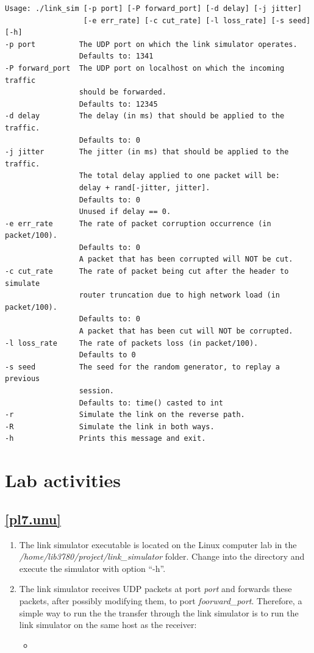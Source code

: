 \documentclass[12pt]{book}
\begin{document}
\begin{enumerate}[label=\arabic*.]
\begin{itemize}[label=--]
\begin{verbatim}
Usage: ./link_sim [-p port] [-P forward_port] [-d delay] [-j jitter]
                  [-e err_rate] [-c cut_rate] [-l loss_rate] [-s seed] [-h]
-p port          The UDP port on which the link simulator operates.
                 Defaults to: 1341
-P forward_port  The UDP port on localhost on which the incoming traffic
                 should be forwarded.
                 Defaults to: 12345
-d delay         The delay (in ms) that should be applied to the traffic.
                 Defaults to: 0
-j jitter        The jitter (in ms) that should be applied to the traffic.
                 The total delay applied to one packet will be:
                 delay + rand[-jitter, jitter].
                 Defaults to: 0
                 Unused if delay == 0.
-e err_rate      The rate of packet corruption occurrence (in packet/100).
                 Defaults to: 0
                 A packet that has been corrupted will NOT be cut.
-c cut_rate      The rate of packet being cut after the header to simulate
                 router truncation due to high network load (in packet/100).
                 Defaults to: 0
                 A packet that has been cut will NOT be corrupted.
-l loss_rate     The rate of packets loss (in packet/100).
                 Defaults to 0
-s seed          The seed for the random generator, to replay a previous
                 session.
                 Defaults to: time() casted to int
-r               Simulate the link on the reverse path.
-R               Simulate the link in both ways.
-h               Prints this message and exit. 
\end{verbatim}
  \end{itemize}


\section{Lab activities}


\subsection{\ref{pl7.unu}}

\begin{enumerate}[label=Activity \arabic*)]
\item The link simulator executable is located on the Linux computer lab in the \emph{/home/lib3780/project/link\_simulator} folder. Change into the directory and execute the simulator with option ``-h''.

\item The link simulator receives UDP packets at port \emph{port} and forwards these packets, after possibly modifying them, to port \emph{foorward\_port}. Therefore, a simple way to run the the transfer through the link simulator is to run the link simulator on the same host as the receiver:
  \begin{itemize}[label=--]
  \item 
  \end{itemize}
  

\end{enumerate}
\end{enumerate}
\end{document}
